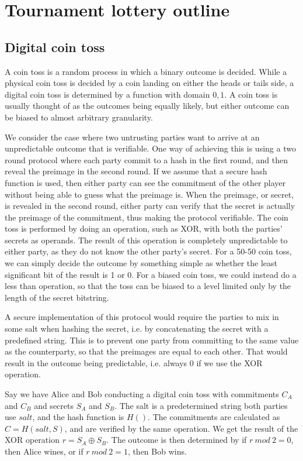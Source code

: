 \section{Tournament lottery outline}
\label{sec:outline}
\subsection{Digital coin toss}
A coin toss is a random process in which a binary outcome is decided. While a physical coin toss is decided by a coin landing on either the heads or tails side, a digital coin toss is determined by a function with domain ${0, 1}$. A coin toss is usually thought of as the outcomes being equally likely, but either outcome can be biased to almost arbitrary granularity.

We consider the case where two untrusting parties want to arrive at an unpredictable outcome that is verifiable. One way of achieving this is using a two round protocol where each party commit to a hash in the first round, and then reveal the preimage in the second round. If we assume that a secure hash function is used, then either party can see the commitment of the other player without being able to guess what the preimage is. When the preimage, or secret, is revealed in the second round, either party can verify that the secret is actually the preimage of the commitment, thus making the protocol verifiable. The coin toss is performed by doing an operation, such as XOR, with both the parties' secrets as operands. The result of this operation is completely unpredictable to either party, as they do not know the other party's secret. For a 50-50 coin toss, we can simply decide the outcome by something simple as whether the least significant bit of the result is 1 or 0. For a biased coin toss, we could instead do a less than operation, so that the toss can be biased to a level limited only by the length of the secret bitstring.

A secure implementation of this protocol would require the parties to mix in some salt when hashing the secret, i.e. by concatenating the secret with a predefined string. This is to prevent one party from committing to the same value as the counterparty, so that the preimages are equal to each other. That would result in the outcome being predictable, i.e. always 0 if we use the XOR operation. 

Say we have Alice and Bob conducting a digital coin toss with commitments $C_A$ and $C_B$ and secrets $S_A$ and $S_B$. The salt is a predetermined string both parties use $salt$, and the hash function is $H()$. The commitments are calculated as $C=H(salt, S)$, and are verified by the same operation. We get the result of the XOR operation $r=S_A \oplus S_B$. The outcome is then determined by if $r\ mod\ 2 = 0$, then Alice wines, or if $r\ mod\ 2 = 1$, then Bob wins.

